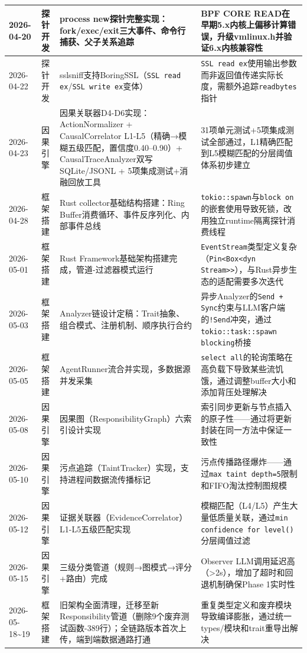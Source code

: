 \documentclass[a4paper]{ctexart}
\makeatletter
\renewcommand{\_}{%
  \ifmmode
    \nfss@text{\textunderscore}%
  \else
    \textunderscore\discretionary{}{}{}%
  \fi}
\makeatother
\begin{document}
{\begin{longtable}{@{} p{4.2cm} p{1.8cm} p{5cm} p{4.2cm} @{}}
\hline
2026-04-20 & 探针开发 & process\_new探针完整实现：fork/exec/exit三大事件、命令行捕获、父子关系追踪 & BPF\_CORE\_READ在早期5.x内核上偏移计算错误，升级vmlinux.h并验证6.x内核兼容性 \\
\hline
2026-04-22 & 探针开发 & sslsniff支持BoringSSL（\texttt{SSL\_read\_ex}/\texttt{SSL\_write\_ex}变体） & \texttt{SSL\_read\_ex}使用输出参数而非返回值传递实际长度，需额外追踪\texttt{readbytes}指针 \\
\hline
2026-04-23 & 因果引擎 & 因果关联器D4-D6实现：ActionNormalizer + CausalCorrelator L1-L5（精确→模糊五级匹配，置信度0.40–0.90）+ CausalTraceAnalyzer双写SQLite/JSONL + 5项集成测试+消融回放工具 & 31项单元测试+5项集成测试全部通过，L1精确匹配到L5模糊匹配的分层阈值体系初步建立 \\
\hline
2026-04-28 & 框架搭建 & Rust collector基础结构搭建：Ring Buffer消费循环、事件反序列化、内部事件总线 & \texttt{tokio::spawn}与\texttt{block\_on}的嵌套使用导致死锁，改用独立runtime隔离探针消费线程 \\
\hline
2026-05-01 & 框架搭建 & Rust Framework基础架构搭建完成，管道-过滤器模式运行 & \texttt{EventStream}类型定义复杂（\texttt{Pin<Box<dyn Stream>>}），与Rust异步生态的适配需要多次迭代 \\
\hline
2026-05-03 & 框架搭建 & Analyzer链设计定稿：Trait抽象、组合模式、注册机制、顺序执行合约 & 异步Analyzer的\texttt{Send + Sync}约束与LLM客户端的\texttt{!Send}冲突，通过\texttt{tokio::task::spawn\_blocking}桥接 \\
\hline
2026-05-05 & 框架搭建 & AgentRunner流合并实现，多数据源并发采集 & \texttt{select\_all}的轮询策略在高负载下导致某些流饥饿，通过调整buffer大小和添加背压处理解决 \\
\hline
2026-05-08 & 因果引擎 & 因果图（ResponsibilityGraph）六索引设计实现 & 索引同步更新与节点插入的原子性——通过将更新封装在同一方法中保证一致性 \\
\hline
2026-05-10 & 因果引擎 & 污点追踪（TaintTracker）实现，支持进程间数据流传播标记 & 污点传播路径爆炸——通过\texttt{max\_taint\_depth=5}限制和FIFO淘汰控制图规模 \\
\hline
2026-05-12 & 因果引擎 & 证据关联器（EvidenceCorrelator）L1-L5五级匹配实现 & 模糊匹配（L4/L5）产生大量低质量关联，通过\texttt{min\_confidence\_for\_level()}分层阈值过滤 \\
\hline
2026-05-15 & 因果引擎 & 三级分类管道（规则→图模式→评分+路由）完成 & Observer LLM调用延迟高（>2s），增加了超时和回退机制确保Phase 1实时性 \\
\hline
2026-05-18\textasciitilde{}19 & 框架搭建 & 旧架构全面清理，迁移至新Responsibility管道（删除9个废弃测试函数-389行）；全链路版本首次上传，端到端数据通路打通 & 重复类型定义和废弃模块导致编译膨胀，通过统一types/模块和trait重导出解决 \\

\end{longtable}}
\end{document}
